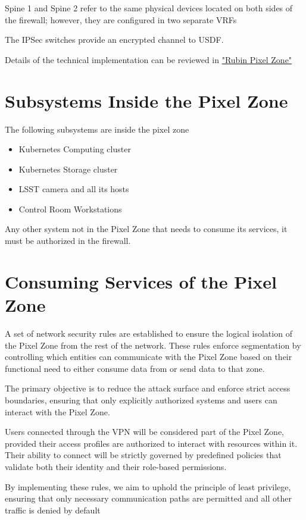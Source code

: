 Spine 1 and Spine 2 refer to the same physical devices located on both sides of the firewall; however, they are configured in two separate VRFs

The IPSec switches provide an encrypted channel to USDF. 

Details of the technical implementation can be reviewed in \href{https://rubinobs.atlassian.net/wiki/x/NAB6IQ}{"Rubin Pixel Zone"}

\section{Subsystems Inside the Pixel Zone}

The following subsystems are inside the pixel zone

\begin{itemize}
    \item Kubernetes Computing cluster
    \item Kubernetes Storage cluster
    \item LSST camera and all its hosts
    \item Control Room Workstations
\end{itemize}

Any other system not in the Pixel Zone that needs to consume its services, it must be authorized in the firewall. 

\section{Consuming Services of the Pixel Zone}

A set of network security rules are  established to ensure the logical isolation of the Pixel Zone from the rest of the network. These rules enforce segmentation by controlling which entities can communicate with the Pixel Zone based on their functional need to either consume data from or send data to that zone.

The primary objective is to reduce the attack surface and enforce strict access boundaries, ensuring that only explicitly authorized systems and users can interact with the Pixel Zone.

Users connected through the VPN will be considered part of the Pixel Zone, provided their access profiles are authorized to interact with resources within it. Their ability to connect will be strictly governed by predefined policies that validate both their identity and their role-based permissions.

By implementing these rules, we aim to uphold the principle of least privilege, ensuring that only necessary communication paths are permitted and all other traffic is denied by default

